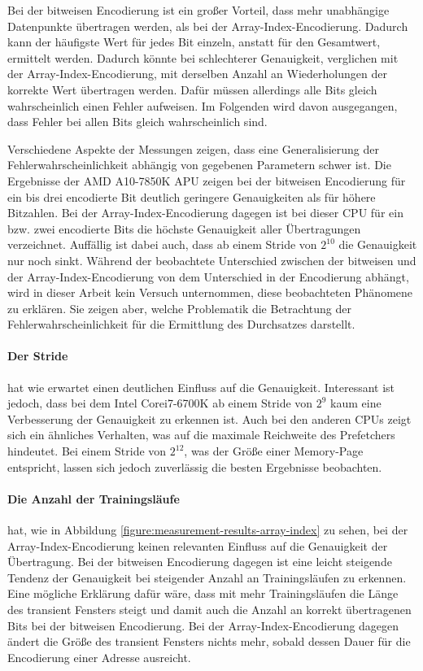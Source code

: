 Bei der bitweisen Encodierung ist ein großer Vorteil, dass mehr
unabhängige Datenpunkte übertragen werden, als bei der
Array-Index-Encodierung. Dadurch kann der häufigste Wert für jedes
Bit einzeln, anstatt für den Gesamtwert, ermittelt werden. Dadurch
könnte bei schlechterer Genauigkeit, verglichen mit der
Array-Index-Encodierung, mit derselben Anzahl an Wiederholungen der
korrekte Wert übertragen werden. Dafür müssen allerdings alle Bits
gleich wahrscheinlich einen Fehler aufweisen. Im Folgenden wird davon
ausgegangen, dass Fehler bei allen Bits gleich wahrscheinlich
sind.

Verschiedene Aspekte der Messungen zeigen, dass eine
Generalisierung der Fehlerwahrscheinlichkeit abhängig von
gegebenen Parametern schwer ist. Die Ergebnisse der
AMD A10-7850K APU zeigen bei der bitweisen Encodierung für
ein bis drei encodierte Bit deutlich geringere Genauigkeiten
als für höhere Bitzahlen. Bei der Array-Index-Encodierung
dagegen ist bei dieser \ac{CPU} für ein bzw. zwei encodierte Bits
die höchste Genauigkeit aller Übertragungen verzeichnet.
Auffällig ist dabei auch, dass ab einem Stride von $2^{10}$ die
Genauigkeit nur noch sinkt. Während der beobachtete Unterschied
zwischen der bitweisen und der Array-Index-Encodierung von dem
Unterschied in der Encodierung abhängt, wird in dieser Arbeit
kein Versuch unternommen, diese beobachteten Phänomene zu
erklären. Sie zeigen aber, welche Problematik die Betrachtung
der Fehlerwahrscheinlichkeit für die Ermittlung des Durchsatzes
darstellt.

\paragraph{Der Stride}
hat wie erwartet einen deutlichen Einfluss auf die Genauigkeit.
Interessant ist jedoch, dass bei dem Intel\textregistered\space
Core\texttrademark\space i7-6700K ab einem Stride von $2^{9}$ kaum
eine Verbesserung der Genauigkeit zu erkennen ist. Auch bei den
anderen \acp{CPU} zeigt sich ein ähnliches Verhalten, was auf die
maximale Reichweite des Prefetchers hindeutet. Bei einem Stride
von $2^{12}$, was der Größe einer Memory-Page entspricht, lassen
sich jedoch zuverlässig die besten Ergebnisse beobachten.

\paragraph{Die Anzahl der Trainingsläufe}
hat, wie in Abbildung \ref{figure:measurement-results-array-index}
zu sehen, bei der Array-Index-Encodierung keinen relevanten
Einfluss auf die Genauigkeit der Übertragung. Bei der bitweisen
Encodierung dagegen ist eine leicht steigende Tendenz der
Genauigkeit bei steigender Anzahl an Trainingsläufen zu erkennen.
Eine mögliche Erklärung dafür wäre, dass mit mehr Trainingsläufen
die Länge des transient Fensters steigt und damit auch die Anzahl
an korrekt übertragenen Bits bei der bitweisen Encodierung. Bei
der Array-Index-Encodierung dagegen ändert die Größe des
transient Fensters nichts mehr, sobald dessen Dauer für die
Encodierung einer Adresse ausreicht.

